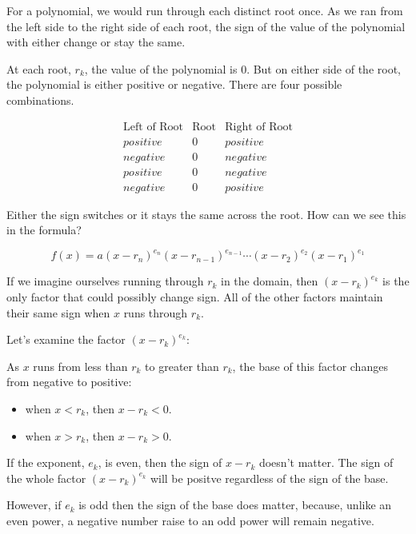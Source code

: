 \documentclass{ximera}
\begin{document}
For a polynomial, we would run through each distinct root once.  As we ran from the left side to the right side of each root, the sign of the value of the polynomial with either change or stay the same.

At each root, $r_k$, the value of the polynomial is $0$.  But on either side of the root, the polynomial is either positive or negative. There are four possible combinations.


\[
\begin{array}{rcl}
\text{Left of Root}  & \text{Root}  & \text{Right of Root} \\
positive & 0 & positive \\
negative & 0 & negative \\
positive & 0 & negative \\
negative & 0 & positive
\end{array}
\]


Either the sign switches or it stays the same across the root.  How can we see this in the formula?



\[   f(x) = a (x-r_n)^{e_n} (x-r_{n-1})^{e_{n-1}}  \cdots (x-r_2)^{e_2} (x-r_1)^{e_1}  \]


If we imagine ourselves running through $r_k$ in the domain, then $(x-r_k)^{e_k}$ is the only factor that could possibly change sign.  All of the other factors maintain their same sign when $x$ runs through $r_k$.



Let's examine the factor $(x-r_k)^{e_k}$:

As $x$ runs from less than $r_k$ to greater than $r_k$, the base of this factor changes from negative to positive:

\begin{itemize}
\item when $x<r_k$, then $x-r_k <0$.  \\

\item when $x>r_k$, then $x-r_k >0$. \\
\end{itemize}


If the exponent, $e_k$, is even, then the sign of $x-r_k$ doesn't matter. The sign of the whole factor $(x-r_k)^{e_k}$ will be positve regardless of the sign of the base.

However, if $e_k$ is odd then the sign of the base does matter, because, unlike an even power, a negative number raise to an odd power will remain negative.
\end{document}
